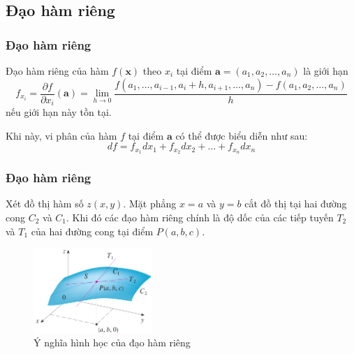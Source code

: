 \subsection{Đạo hàm riêng}
\begin{frame}
\frametitle{Đạo hàm riêng}
\begin{tcolorbox}[colback=blue!10!, colframe=blue!50!black, title=Định nghĩa]
Đạo hàm riêng của hàm \(f(\mathbf x)\) theo \(x_i\) tại điểm \(\mathbf{a} = (a_1, a_2, \ldots, a_n)\) là giới hạn
\begin{equation}
f_{x_i}=\frac{\partial f}{\partial x_i}(\mathbf{a}) = \lim_{h \to 0} \frac{f(a_1, \ldots, a_{i-1}, a_i + h, a_{i+1}, \ldots, a_n) - f(a_1, a_2, \ldots, a_n)}{h}
\end{equation}
nếu giới hạn này tồn tại.
\end{tcolorbox}
Khi này, vi phân của hàm \(f\) tại điểm \(\mathbf{a}\) có thể được biểu diễn như sau:
\begin{equation}
df = f_{x_1} dx_1 + f_{x_2} dx_2 + \ldots + f_{x_n} dx_n
\end{equation}
\end{frame}

\begin{frame}
\frametitle{Đạo hàm riêng}
Xét đồ thị hàm số \(z(x, y)\). Mặt phẳng \(x=a\) và \(y=b\) cắt đồ thị tại hai đường cong \(C_2\) và \(C_1\). Khi đó các đạo hàm riêng chính là độ dốc của các tiếp tuyến \(T_2\) và \(T_1\) của hai đường cong tại điểm \(P(a, b, c)\).
\begin{figure}
    \centering
    \includegraphics[width=0.4\textwidth]{Content/Figure/PartialDerivatives.png}
    \caption{Ý nghĩa hình học của đạo hàm riêng}
\end{figure}
\end{frame}

